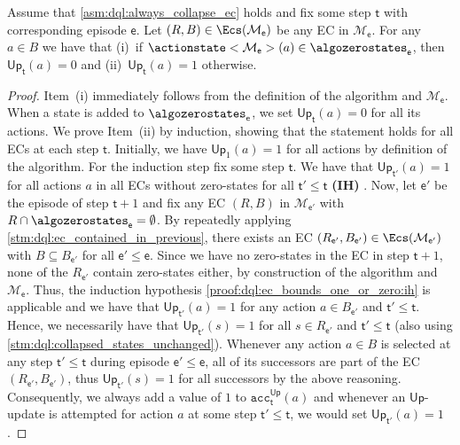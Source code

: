\documentclass{theoretics}
\makeatletter
\newcommand{\intersectionSym}{\cap}
\newcommand{\intersectionBin}{\mathbin{\intersectionSym}}
\newcommand{\intersection}{\intersectionBin}
\newcommand{\MDP}{\mathcal{M}}
\newcommand{\upperbound}{\mathsf{Up}}
\newcommand{\acc}{\texttt{acc}}
\newcommand{\algostep}{\mathsf{t}}
\newcommand{\algoepisode}{\mathsf{e}}
\def\alabel#1#2{\begingroup
	\textbf{(#2)}\def\@currentlabel{\textbf{[#2]}}\phantomsection\label{#1}\endgroup
}
\makeatother
\begin{document}
\begin{lemma} \label{stm:dql:ec_bounds_one_or_zero}
	Assume that \cref{asm:dql:always_collapse_ec} holds and fix some step $\algostep$ with corresponding episode $\algoepisode$.
	Let $(R, B) \in \Ecs(\MDP_\algoepisode)$ be any EC in $\MDP_\algoepisode$.
	For any $a \in B$ we have that (i)~if $\actionstate<\MDP_\algoepisode>(a) \in \algozerostates_\algoepisode$, then $\upperbound_\algostep(a) = 0$ and (ii)~$\upperbound_\algostep(a) = 1$ otherwise.
\end{lemma}

\begin{proof}
	Item~(i) immediately follows from the definition of the algorithm and $\MDP_\algoepisode$.
	When a state is added to $\algozerostates_\algoepisode$, we set $\upperbound_\algostep(a) = 0$ for all its actions.
	We prove Item~(ii) by induction, showing that the statement holds for all ECs at each step $\algostep$.
	Initially, we have $\upperbound_1(a) = 1$ for all actions by definition of the algorithm.
	For the induction step fix some step $\algostep$.
	We have that $\upperbound_{\algostep'}(a) = 1$ for all actions $a$ in all ECs without zero-states for all $\algostep' \leq \algostep$ \alabel{proof:dql:ec_bounds_one_or_zero:ih}{IH}.
	Now, let $\algoepisode'$ be the episode of step $\algostep + 1$ and fix any EC $(R, B)$ in $\MDP_{\algoepisode'}$ with $R \intersection \algozerostates_\algoepisode = \emptyset$.
	By repeatedly applying \cref{stm:dql:ec_contained_in_previous}, there exists an EC $(R_{\algoepisode'}, B_{\algoepisode'}) \in \Ecs(\MDP_{\algoepisode'})$ with $B \subseteq B_{\algoepisode'}$ for all $\algoepisode' \leq \algoepisode$.
	Since we have no zero-states in the EC in step $\algostep + 1$, none of the $R_{\algoepisode'}$ contain zero-states either, by construction of the algorithm and $\MDP_\algoepisode$.
	Thus, the induction hypothesis \ref{proof:dql:ec_bounds_one_or_zero:ih} is applicable and we have that $\upperbound_{\algostep'}(a) = 1$ for any action $a \in B_{\algoepisode'}$ and $\algostep' \leq \algostep$.
	Hence, we necessarily have that $\upperbound_{\algostep'}(s) = 1$ for all $s \in R_{\algoepisode'}$ and $\algostep' \leq \algostep$ (also using \cref{stm:dql:collapsed_states_unchanged}).
	Whenever any action $a \in B$ is selected at any step $\algostep' \leq \algostep$ during episode $\algoepisode' \leq \algoepisode$, all of its successors are part of the EC $(R_{\algoepisode'}, B_{\algoepisode'})$, thus $\upperbound_{\algostep'}(s) = 1$ for all successors by the above reasoning.
	Consequently, we always add a value of $1$ to $\acc_\algostep^\upperbound(a)$ and whenever an $\upperbound$-update is attempted for action $a$ at some step $\algostep' \leq \algostep$, we would set $\upperbound_{\algostep'}(a) = 1$. 
\end{proof}
\end{document}
